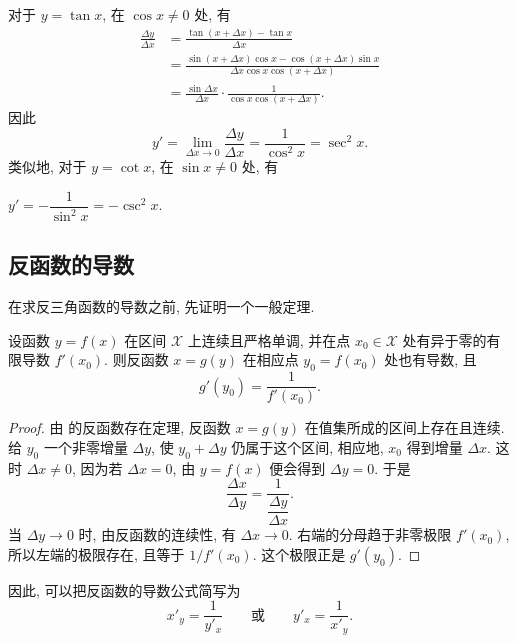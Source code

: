 对于 $y=\tan x$, 在 $\cos x\neq0$ 处, 有
$$
\begin{aligned}
\frac{\Delta y}{\Delta x}
&=\frac{\tan(x+\Delta x)-\tan x}{\Delta x}\\
&=\frac{\sin(x+\Delta x)\cos x-\cos(x+\Delta x)\sin x}
{\Delta x\cos x\cos(x+\Delta x)}\\
&=\frac{\sin\Delta x}{\Delta x}\cdot
\frac1{\cos x\cos(x+\Delta x)}.
\end{aligned}
$$
因此
$$
y'=\lim_{\Delta x\to0}\frac{\Delta y}{\Delta x}
=\frac1{\cos^2x}=\sec^2x.
$$
类似地, 对于 $y=\cot x$, 在 $\sin x\neq0$ 处, 有
\begin{center}
$
y'=-\dfrac1{\sin^2x}=-\csc^2x.
$
\end{center}

\subsection{反函数的导数}\label{subsec:94}
在求反三角函数的导数之前, 先证明一个一般定理.

\begin{theorem}\label{thm:inverse_function_derivative}
设函数 $y=f(x)$ 在区间 $\mathcal{X}$ 上连续且严格单调,
并在点 $x_0\in\mathcal{X}$ 处有异于零的有限导数 $f'(x_0)$.
则反函数 $x=g(y)$ 在相应点 $y_0=f(x_0)$ 处也有导数, 且
$$
g'(y_0)=\frac1{f'(x_0)}.
$$
\end{theorem}

\begin{proof}
由  的反函数存在定理,
反函数 $x=g(y)$ 在值集所成的区间上存在且连续.
给 $y_0$ 一个非零增量 $\Delta y$, 使 $y_0+\Delta y$ 仍属于这个区间,
相应地, $x_0$ 得到增量 $\Delta x$.
这时 $\Delta x\neq0$, 因为若 $\Delta x=0$, 由 $y=f(x)$ 便会得到 $\Delta y=0$.
于是
$$
\frac{\Delta x}{\Delta y}=\frac1{\dfrac{\Delta y}{\Delta x}}.
$$
当 $\Delta y\to0$ 时, 由反函数的连续性, 有 $\Delta x\to0$.
右端的分母趋于非零极限 $f'(x_0)$,
所以左端的极限存在, 且等于 $1/f'(x_0)$.
这个极限正是 $g'(y_0)$.
\end{proof}

因此, 可以把反函数的导数公式简写为
$$
x'_y=\frac1{y'_x} \qquad \text{或} \qquad y'_x=\frac1{x'_y} .
$$

